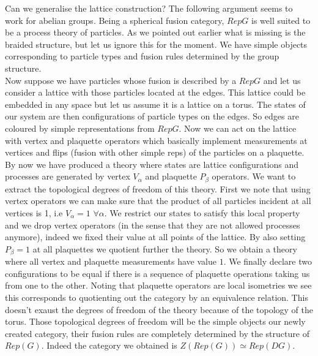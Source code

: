 \documentclass{article}
\newenvironment{remark}[1][Remark]{\begin{trivlist}
\item[\hskip \labelsep {\bfseries #1}]}{\end{trivlist}}
\begin{document}
\begin{remark}
	Can we generalise the lattice construction?
	The following argument seems to work for abelian groups.
	Being a spherical fusion category, $RepG$ is well suited to be a process theory of particles. As we pointed out earlier what is missing is the braided structure, but let us ignore this for the moment. We have simple objects corresponding to particle types and fusion rules determined by the group structure.\\
	Now suppose we have particles whose fusion is described by a $RepG$ and let us consider a lattice with those particles located at the edges. This lattice could be embedded in any space but let us assume it is a lattice on a torus. The states of our system are then configurations of particle types on the edges. So edges are coloured by simple representations from $RepG$. Now we can act on the lattice with vertex and plaquette operators which basically implement measurements at vertices and flips (fusion with other simple reps) of the particles on a plaquette. By now we have produced a theory where states are lattice configurations and processes are generated by vertex $V_\alpha$ and plaquette $P_\beta$ operators. We want to extract the topological degrees of freedom of this theory. First we note that using vertex operators we can make sure that the product of all particles incident at all vertices is 1, i.e $V_\alpha=1$ $\forall \alpha$. We restrict our states to satisfy this local property and we drop vertex operators (in the sense that they are not allowed processes anymore), indeed we fixed their value at all points of the lattice. By also setting $P_\beta =1$ at all plaquettes we quotient further the theory. So we obtain a theory where all vertex and plaquette measurements have value $1$. We finally declare two configurations to be equal if there is a sequence of plaquette operations taking us from one to the other. Noting that plaquette operators are local isometries we see this corresponds to quotienting out the category by an equivalence relation. This doesn't exaust the degrees of freedom of the theory because of the topology of the torus. Those topological degrees of freedom will be the simple objects our newly created category, their fusion rules are completely determined by the structure of $Rep(G)$. Indeed the category we obtained is $Z(Rep(G)) \simeq Rep(DG)$.	
\end{remark}
\end{document}
